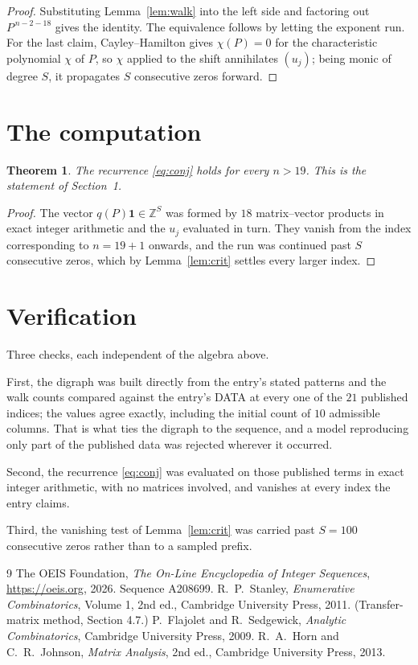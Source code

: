 \documentclass[11pt,a4paper]{article}
\theoremstyle{plain}
\newtheorem{theorem}{Theorem}
\theoremstyle{definition}
\begin{document}
\begin{proof}
Substituting Lemma~\ref{lem:walk} into the left side and factoring out
$P^{\,n-2-18}$ gives the identity. The equivalence follows by letting the exponent
run. For the last claim, Cayley--Hamilton gives $\chi(P)=0$ for the characteristic
polynomial $\chi$ of $P$, so $\chi$ applied to the shift annihilates $(u_j)$; being monic of
degree $S$, it propagates $S$ consecutive zeros forward.
\end{proof}

\section{The computation}

\begin{theorem}
The recurrence \eqref{eq:conj} holds for every $n>19$. This is the statement of
Section~1.
\end{theorem}

\begin{proof}
The vector $q(P)\mathbf{1}\in\mathbb{Z}^{S}$ was formed by $18$ matrix--vector
products in exact integer arithmetic and the $u_j$ evaluated in turn. They vanish from the
index corresponding to $n=19+1$ onwards, and the run was continued past $S$ consecutive
zeros, which by Lemma~\ref{lem:crit} settles every larger index.
\end{proof}

\section{Verification}

Three checks, each independent of the algebra above.

First, the digraph was built directly from the entry's stated patterns and the walk counts
compared against the entry's DATA at every one of the $21$ published indices; the
values agree exactly, including the initial count of $10$ admissible columns. That is
what ties the digraph to the sequence, and a model reproducing only part of the published
data was rejected wherever it occurred.

Second, the recurrence \eqref{eq:conj} was evaluated on those published terms in exact
integer arithmetic, with no matrices involved, and vanishes at every index the entry claims.

Third, the vanishing test of Lemma~\ref{lem:crit} was carried past $S=100$ consecutive
zeros rather than to a sampled prefix.

\begin{thebibliography}{9}
 The OEIS Foundation, \emph{The On-Line Encyclopedia of Integer
Sequences}, \url{https://oeis.org}, 2026. Sequence A208699.
 R.~P.~Stanley, \emph{Enumerative Combinatorics}, Volume 1, 2nd ed.,
Cambridge University Press, 2011. (Transfer-matrix method, Section 4.7.)
 P.~Flajolet and R.~Sedgewick, \emph{Analytic Combinatorics}, Cambridge
University Press, 2009.
 R.~A.~Horn and C.~R.~Johnson, \emph{Matrix Analysis}, 2nd ed., Cambridge
University Press, 2013.
\end{thebibliography}
\end{document}
